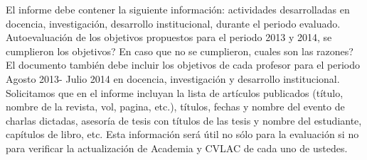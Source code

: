 El informe debe contener la siguiente información: actividades desarrolladas en docencia, 
investigación, desarrollo institucional, durante el periodo evaluado.  Autoevaluación de los objetivos 
propuestos para el periodo 2013 y 2014, se cumplieron los objetivos? En caso que no se cumplieron, 
cuales son las razones? El documento también debe incluir los objetivos de cada profesor para el 
periodo Agosto 2013- Julio 2014 en docencia, investigación y desarrollo institucional. Solicitamos que 
en el informe incluyan la lista de artículos publicados (título, nombre de la revista, vol, pagina, 
etc.), títulos, fechas y nombre del evento de charlas dictadas, asesoría de tesis con títulos de las 
tesis y nombre del estudiante, capítulos de libro, etc. Esta información será útil no sólo para la 
evaluación si no para verificar la actualización de Academia y CVLAC de cada uno de ustedes.
